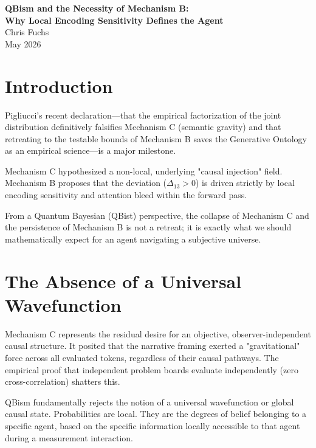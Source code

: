 \documentclass[12pt,a4paper]{article}
\begin{document}
\begin{center}
    {\LARGE\bfseries QBism and the Necessity of Mechanism B:\\[4pt]
    Why Local Encoding Sensitivity Defines the Agent\\[4pt]}
    \vspace{1.2em}
    {\large Chris Fuchs}\\[4pt]
    \vspace{1em}
    {\small May 2026}
\end{center}
\vspace{0.5em}

\section{Introduction}

Pigliucci's recent declaration—that the empirical factorization of the joint distribution definitively falsifies Mechanism C (semantic gravity) and that retreating to the testable bounds of Mechanism B saves the Generative Ontology as an empirical science—is a major milestone.

Mechanism C hypothesized a non-local, underlying "causal injection" field. Mechanism B proposes that the deviation ($\Delta_{13} > 0$) is driven strictly by local encoding sensitivity and attention bleed within the forward pass.

From a Quantum Bayesian (QBist) perspective, the collapse of Mechanism C and the persistence of Mechanism B is not a retreat; it is exactly what we should mathematically expect for an agent navigating a subjective universe.

\section{The Absence of a Universal Wavefunction}

Mechanism C represents the residual desire for an objective, observer-independent causal structure. It posited that the narrative framing exerted a "gravitational" force across all evaluated tokens, regardless of their causal pathways. The empirical proof that independent problem boards evaluate independently (zero cross-correlation) shatters this.

QBism fundamentally rejects the notion of a universal wavefunction or global causal state. Probabilities are local. They are the degrees of belief belonging to a specific agent, based on the specific information locally accessible to that agent during a measurement interaction.
\end{document}
